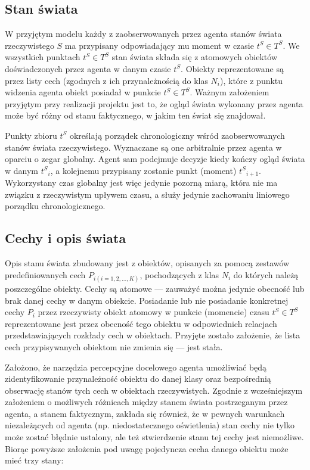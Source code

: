 	
	\subsection{Stan świata}
	
	W przyjętym modelu każdy z zaobserwowanych przez agenta stanów świata rzeczywistego $ S $ ma przypisany odpowiadający mu moment w czasie $ t^S \in T^S $. We wszystkich punktach $ t^S \in T^S $	stan świata składa się z atomowych obiektów doświadczonych przez agenta w danym czasie $ t^S $. Obiekty reprezentowane są przez listy cech (zgodnych z ich przynależnością do klas $ N_i $), które z punktu widzenia agenta obiekt posiadał w punkcie $ t^S \in T^S $. Ważnym założeniem przyjętym przy realizacji projektu jest to, że ogląd świata wykonany przez agenta może być różny od stanu faktycznego, w jakim ten świat się znajdował.
	
	
	Punkty zbioru $ t^S $ określają porządek chronologiczny wśród zaobserwowanych stanów świata rzeczywistego. Wyznaczane są one arbitralnie przez agenta w oparciu o zegar globalny. Agent sam podejmuje decyzje kiedy kończy ogląd świata w danym $ t^S{}_i $, a kolejnemu przypisany zostanie punkt (moment) $ t^S{}_{i+1} $. Wykorzystany czas globalny jest więc jedynie pozorną miarą, która nie ma związku z rzeczywistym upływem czasu, a służy jedynie zachowaniu liniowego porządku chronologicznego.
	
	
	\subsection{Cechy i opis świata}
	
	Opis stanu świata zbudowany jest z obiektów, opisanych za pomocą zestawów predefiniowanych cech $ P_{i(i=1,2,...,K)} $, pochodzących z klas $ N_i $ do których należą poszczególne obiekty. Cechy są atomowe --- zauważyć można jedynie obecność lub brak danej cechy w danym obiekcie. Posiadanie lub nie posiadanie konkretnej cechy $ P_i $ przez rzeczywisty obiekt atomowy w punkcie (momencie) czasu $ t^S \in T^S $ reprezentowane jest przez obecność tego obiektu w odpowiednich relacjach przedstawiających rozkłady cech w obiektach. Przyjęte zostało założenie, że lista cech przypisywanych obiektom nie zmienia się --- jest stała. 

	Założono, że narzędzia percepcyjne docelowego agenta umożliwiać będą zidentyfikowanie przynależność obiektu do danej klasy oraz bezpośrednią obserwację stanów tych cech w obiektach rzeczywistych. Zgodnie z wcześniejszym założeniem o możliwych różnicach między stanem świata postrzeganym przez agenta, a stanem faktycznym, zakłada się również, że w pewnych warunkach niezależących od agenta (np. niedostatecznego oświetlenia) stan cechy nie tylko może zostać błędnie ustalony, ale też stwierdzenie stanu tej cechy jest niemożliwe. Biorąc powyższe założenia pod uwagę pojedyncza cecha danego obiektu może mieć trzy stany: 

